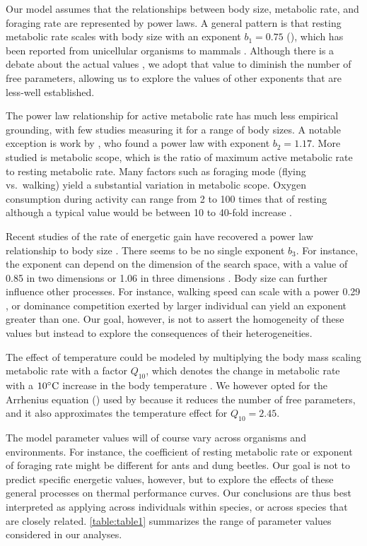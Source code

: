 Our model assumes that the relationships between body size, metabolic rate, and foraging rate are represented by power laws.
A general pattern is that resting metabolic rate scales with body size with an exponent $b_1 = 0.75$ (), which has been reported from unicellular organisms to mammals \citep{Kleiber1947, Peters1986,Gillooly2001,Brown2004}.
Although there is a debate about the actual values \citep[e.g.,][]{Isaac2010}, we adopt that value to diminish the number of free parameters, allowing us to explore the values of other exponents that are less-well established.

The power law relationship for active metabolic rate has much less empirical grounding, with few studies measuring it for a range of body sizes.
A notable exception is work by \citet{Bartholomew1978}, who found a power law with exponent $b_2 = 1.17$.
More studied is metabolic scope, which is the ratio of maximum active metabolic rate to resting metabolic rate.
Many factors such as foraging mode (flying vs.\ walking) yield a substantial variation in metabolic scope.
Oxygen consumption during activity can range from 2 to 100 times that of resting \citep{Bartholomew1978, Bartholomew1981, Bartholomew1985, Chown2004, Niitepold2010} although a typical value would be between 10 to 40-fold increase \citep{Bartholomew1981, Niitepold2010}. %

Recent studies of the rate of energetic gain have recovered a power law relationship to body size \citep{Pawar2012, Maino2015}.
There seems to be no single exponent $b_3$.
For instance, the exponent can depend on the dimension of the search space, with a value of 0.85 in two dimensions or 1.06 in three dimensions \citep{Pawar2012}.
Body size can further influence other processes.
For instance, walking speed  can scale with a power 0.29 \citep{Peters1986}, or dominance competition exerted by larger individual can yield an exponent greater than one.
Our goal, however, is not to assert the homogeneity of these values but instead to explore the consequences of their heterogeneities.

The effect of temperature could be modeled by multiplying the body mass scaling metabolic rate with a factor $Q_{10}$, which denotes the change in metabolic rate with a $10^ {\circ} \rm{C}$ increase in the body temperature \citep{Precht1973}.
We however opted for the Arrhenius equation () used by \citet{Brown2004} because it reduces the number of free parameters, and it also approximates the temperature effect for $Q_{10} = 2.45$.

The model parameter values will of course vary across organisms and environments.
For instance, the coefficient of resting metabolic rate or exponent of foraging rate might be different for ants and dung beetles.
Our goal is not to predict specific energetic values, however, but to explore the effects of these general processes on thermal performance curves.
Our conclusions are thus best interpreted as applying across individuals within species, or across species that are closely related.
\cref{table:table1} summarizes the range of parameter values considered in our analyses.
